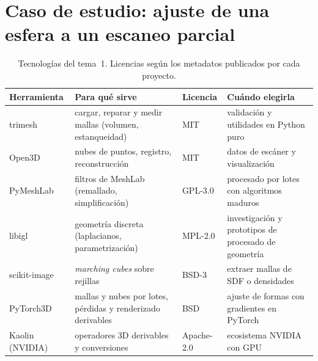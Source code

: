 \section{Caso de estudio: ajuste de una esfera a un escaneo parcial}

\addtocounter{definicion}{1}%

\begin{table}[h]
\centering\small
\begin{tabularx}{\textwidth}{@{}l>{\raggedright\arraybackslash}X>{\raggedright\arraybackslash}p{2.6cm}>{\raggedright\arraybackslash}X@{}}
\toprule
Herramienta & Para qué sirve & Licencia & Cuándo elegirla \\
\midrule
trimesh & cargar, reparar y medir mallas (volumen, estanqueidad) & MIT & validación y utilidades en Python puro \\
Open3D & nubes de puntos, registro, reconstrucción & MIT & datos de escáner y visualización \\
PyMeshLab & filtros de MeshLab (remallado, simplificación) & GPL-3.0 & procesado por lotes con algoritmos maduros \\
libigl & geometría discreta (laplacianos, parametrización) & MPL-2.0 & investigación y prototipos de procesado de geometría \\
scikit-image & \emph{marching cubes} sobre rejillas & BSD-3 & extraer mallas de SDF o densidades \\
PyTorch3D & mallas y nubes por lotes, pérdidas y renderizado derivables & BSD & ajuste de formas con gradientes en PyTorch \\
Kaolin (NVIDIA) & operadores 3D derivables y conversiones & Apache-2.0 & ecosistema NVIDIA con GPU \\
\bottomrule
\end{tabularx}
\caption{Tecnologías del tema~1. Licencias según los metadatos publicados por cada proyecto.}
\label{tab:tec1}
\end{table}

\addtocounter{definicion}{1}%

